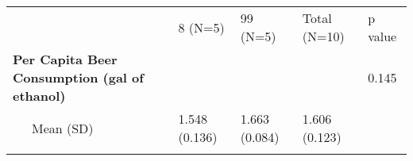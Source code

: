 \begin{longtable}[c]{@{}lllll@{}}
\toprule\addlinespace
\begin{minipage}[b]{0.33\columnwidth}\raggedright
\end{minipage} & \begin{minipage}[b]{0.15\columnwidth}\raggedright
8 (N=5)
\end{minipage} & \begin{minipage}[b]{0.15\columnwidth}\raggedright
99 (N=5)
\end{minipage} & \begin{minipage}[b]{0.15\columnwidth}\raggedright
Total (N=10)
\end{minipage} & \begin{minipage}[b]{0.52\columnwidth}\raggedright
p value
\end{minipage}
\\\addlinespace
\midrule\endhead
\begin{minipage}[t]{0.33\columnwidth}\raggedright
\textbf{Per Capita Beer Consumption (gal of ethanol)}
\end{minipage} & \begin{minipage}[t]{0.15\columnwidth}\raggedright
\end{minipage} & \begin{minipage}[t]{0.15\columnwidth}\raggedright
\end{minipage} & \begin{minipage}[t]{0.15\columnwidth}\raggedright
\end{minipage} & \begin{minipage}[t]{0.52\columnwidth}\raggedright
0.145
\end{minipage}
\\\addlinespace
\begin{minipage}[t]{0.33\columnwidth}\raggedright
~~~Mean (SD)
\end{minipage} & \begin{minipage}[t]{0.15\columnwidth}\raggedright
1.548 (0.136)
\end{minipage} & \begin{minipage}[t]{0.15\columnwidth}\raggedright
1.663 (0.084)
\end{minipage} & \begin{minipage}[t]{0.15\columnwidth}\raggedright
1.606 (0.123)
\end{minipage} & \begin{minipage}[t]{0.52\columnwidth}\raggedright
\end{minipage}
\\\addlinespace

\end{longtable}
